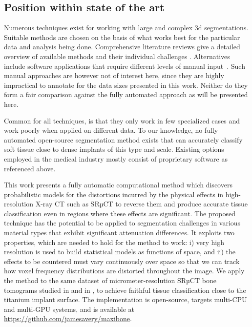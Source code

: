 \subsection*{Position within state of the art}

Numerous techniques exist for working with large and complex 3d segmentations.
Suitable methods are chosen on the basis of what works best for the particular
data and analysis being done. Comprehensive literature reviews give a detailed
overview of available methods and their individual challenges
\cite{seg_literature_review}. Alternatives include software applications that
require different levels of manual
input~\cite{software_pore3d,software_itk_snap,software_dragonfly,software_avizo}.
Such manual approaches are however not of interest here, since they are highly
impractical to annotate for the data sizes presented in this work. Neither do
they form a fair comparison against the fully automated approach as will be
presented here.

Common for all techniques, is that they only work in few specialized cases and
work poorly when applied on different data. To our knowledge, no fully automated
open-source segmentation method exists that can accurately classify soft tissue
close to dense implants of this type and scale. Existing options employed in the
medical industry mostly consist of proprietary software as referenced above.

This work presents a fully automatic computational method which discovers
probabilistic models for the distortions incurred by the physical effects in
high-resolution X-ray CT such as SRµCT to reverse them and produce accurate
tissue classification even in regions where these effects are significant. The
proposed technique has the potential to be applied to segmentation challenges in
various material types that exhibit significant attenuation differences. It
exploits two properties, which are needed to hold for the method to work: i)
very high resolution is used to build statistical models as functions of space,
and ii) the effects to be countered must vary continuously over space so that we
can track how voxel frequency distributions are distorted throughout the image.
We apply the method to the same dataset of micrometer-resolution SRµCT bone
tomograms studied in \cite{torsten2018} and in \cite{sporring}, to achieve
faithful tissue classification close to the titanium implant surface. The
implementation is open-source, targets multi-CPU and multi-GPU systems, and is
available at \href{https://github.com/jamesavery/maxibone}
{https://github.com/jamesavery/maxibone}.

